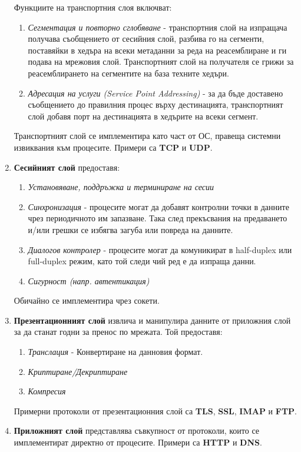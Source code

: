 \documentclass[fleqn,12pt]{article}
\begin{document}
\begin{enumerate}
    Функциите на транспортния слоя включват:
    \begin{enumerate}
        \item \textit{Сегментация и повторно сглобяване} - транспортния слой на изпращача получава съобщението от сесийния слой, разбива го на сегменти, поставяйки в хедъра на всеки метаданни за реда на реасемблиране и ги подава на мрежовия слой.
        Транспортният слой на получателя се грижи за реасемблирането на сегментите на база техните хедъри.
        \item \textit{Адресация на услуги (Service Point Addressing)} - за да бъде доставено съобщението до правилния процес върху дестинацията, транспортният слой добавя порт на дестинацията в хедърите на всеки сегмент.
    \end{enumerate}
    Транспортният слой се имплементира като част от ОС, правеща системни извиквания към процесите. Примери са \textbf{TCP} и \textbf{UDP}.
    \item \textbf{Сесийният слой} предоставя:
    \begin{enumerate}
        \item \textit{Установяване, поддръжка и терминиране на сесии}
        \item \textit{Синхронизация} - процесите могат да добавят контролни точки в данните чрез периодичното им запазване.
        Така след прекъсвания на предаването и/или грешки се избягва загуба или повреда на данните.
        \item \textit{Диалогов контролер} - процесите могат да комуникират в half-duplex или full-duplex режим, като той следи чий ред е да изпраща данни.
        \item \textit{Сигурност (напр. автентикация)}
    \end{enumerate}
    Обичайно се имплементира чрез сокети.
    \item \textbf{Презентационният слой} извлича и манипулира данните от приложния слой за да станат годни за пренос по мрежата. Той предоставя:
    \begin{enumerate}
        \item \textit{Транслация} - Конвертиране на данновия формат.
        \item \textit{Криптиране/Декриптиране}
        \item \textit{Компресия}
    \end{enumerate}
    Примерни протоколи от презентационния слой са \textbf{TLS}, \textbf{SSL}, \textbf{IMAP} и \textbf{FTP}.
    \item \textbf{Приложният слой} представлява съвкупност от протоколи, които се имплементират директно от процесите. Примери са \textbf{HTTP} и \textbf{DNS}.
\end{enumerate}
\end{document}
